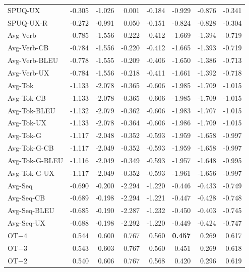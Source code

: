 {\begin{longtable}{@{}lrrrrrrr@{}}
SPUQ-UX & -0.305 & -1.026 & \phantom{-}0.001 & -0.184 & -0.929 & -0.876 & -0.341 \\
SPUQ-UX-R & -0.272 & -0.991 & \phantom{-}0.050 & -0.151 & -0.824 & -0.828 & -0.304 \\
\addlinespace
Avg-Verb & -0.785 & -1.556 & -0.222 & -0.412 & -1.669 & -1.394 & -0.719 \\
Avg-Verb-CB & -0.784 & -1.556 & -0.220 & -0.412 & -1.665 & -1.393 & -0.719 \\
Avg-Verb-BLEU & -0.778 & -1.555 & -0.209 & -0.406 & -1.650 & -1.386 & -0.713 \\
Avg-Verb-UX & -0.784 & -1.556 & -0.218 & -0.411 & -1.661 & -1.392 & -0.718 \\
\addlinespace
Avg-Tok & -1.133 & -2.078 & -0.365 & -0.606 & -1.985 & -1.709 & -1.015 \\
Avg-Tok-CB & -1.133 & -2.078 & -0.365 & -0.606 & -1.985 & -1.709 & -1.015 \\
Avg-Tok-BLEU & -1.132 & -2.079 & -0.362 & -0.606 & -1.983 & -1.707 & -1.015 \\
Avg-Tok-UX & -1.133 & -2.078 & -0.364 & -0.606 & -1.986 & -1.709 & -1.015 \\
Avg-Tok-G & -1.117 & -2.048 & -0.352 & -0.593 & -1.959 & -1.658 & -0.997 \\
Avg-Tok-G-CB & -1.117 & -2.049 & -0.352 & -0.593 & -1.959 & -1.658 & -0.997 \\
Avg-Tok-G-BLEU & -1.116 & -2.049 & -0.349 & -0.593 & -1.957 & -1.648 & -0.995 \\
Avg-Tok-G-UX & -1.117 & -2.049 & -0.352 & -0.593 & -1.961 & -1.656 & -0.997 \\
\addlinespace
Avg-Seq & -0.690 & -0.200 & -2.294 & -1.220 & -0.446 & -0.433 & -0.749 \\
Avg-Seq-CB & -0.689 & -0.198 & -2.294 & -1.221 & -0.447 & -0.428 & -0.748 \\
Avg-Seq-BLEU & -0.685 & -0.190 & -2.287 & -1.232 & -0.450 & -0.403 & -0.745 \\
Avg-Seq-UX & -0.688 & -0.198 & -2.292 & -1.220 & -0.449 & -0.424 & -0.747 \\
\addlinespace
OT$-4$ & \phantom{-}0.544 & \phantom{-}0.600 & \phantom{-}0.767 & \phantom{-}0.560 & \textbf{\phantom{-}0.457} & \phantom{-}0.269 & \phantom{-}0.617 \\
OT$-3$ & \phantom{-}0.543 & \phantom{-}0.603 & \phantom{-}0.767 & \phantom{-}0.560 & \phantom{-}0.451 & \phantom{-}0.269 & \phantom{-}0.618 \\
OT$-2$ & \phantom{-}0.540 & \phantom{-}0.606 & \phantom{-}0.767 & \phantom{-}0.568 & \phantom{-}0.420 & \phantom{-}0.296 & \phantom{-}0.619 \\

\end{longtable}}
